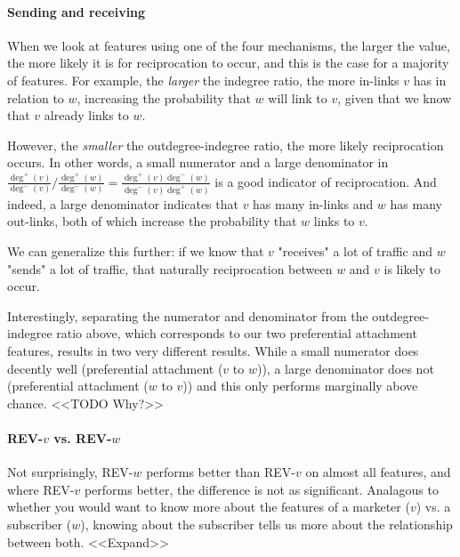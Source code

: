\documentclass[conference]{IEEEtran}
\begin{document}
\paragraph{Sending and receiving}
When we look at features using one of the four mechanisms, the larger the value, the more likely it is for reciprocation to occur, and this is the case for a majority of features. For example, the \emph{larger} the indegree ratio, the more in-links $v$ has in relation to $w$, increasing the probability that $w$ will link to $v$, given that we know that $v$ already links to $w$.

However, the \emph{smaller} the outdegree-indegree ratio, the more likely reciprocation occurs. In other words, a small numerator and a large denominator in $\frac{\deg^+(v)}{\deg^-(v)} / \frac{\deg^+(w)}{\deg^-(w)} = \frac{\deg^+(v)\deg^-(w)}{\deg^-(v)\deg^+(w)}$ is a good indicator of reciprocation. And indeed, a large denominator indicates that $v$ has many in-links and $w$ has many out-links, both of which increase the probability that $w$ links to $v$.

We can generalize this further: if we know that $v$ "receives" a lot of traffic and $w$ "sends" a lot of traffic, that naturally reciprocation between $w$ and $v$ is likely to occur.

Interestingly, separating the numerator and denominator from the outdegree-indegree ratio above, which corresponds to our two preferential attachment features, results in two very different results. While a small numerator does decently well (preferential attachment ($v$ to $w$)), a large denominator does not (preferential attachment ($w$ to $v$)) and this only performs marginally above chance. <<TODO Why?>>

\paragraph{REV-$v$ vs. REV-$w$}
Not surprisingly, REV-$w$ performs better than REV-$v$ on almost all features, and where REV-$v$ performs better, the difference is not as significant. Analagous to whether you would want to know more about the features of a marketer ($v$) vs. a subscriber ($w$), knowing about the subscriber tells us more about the relationship between both. <<Expand>>
\end{document}
